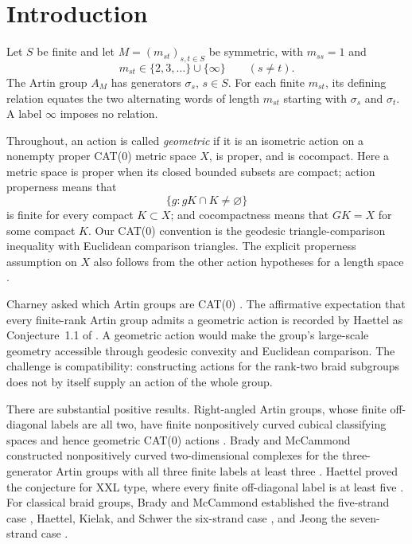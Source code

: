 \section{Introduction}\label{sec:introduction}

Let \(S\) be finite and let \(M=(m_{st})_{s,t\in S}\) be symmetric,
with \(m_{ss}=1\) and
\[
 m_{st}\in\{2,3,\ldots\}\cup\{\infty\}\qquad(s\ne t).
\]
The Artin group \(A_M\) has generators \(\sigma_s\), \(s\in S\).
For each finite \(m_{st}\), its defining relation equates the two
alternating words of length \(m_{st}\) starting with \(\sigma_s\) and
\(\sigma_t\).  A label \(\infty\) imposes no relation.

Throughout, an action is called \emph{geometric} if it is an isometric
action on a nonempty proper CAT(0) metric space \(X\), is proper, and is
cocompact.  Here a metric space is proper when its closed bounded subsets
are compact; action properness means that
\[
 \{g:gK\cap K\ne\varnothing\}
\]
is finite for every compact \(K\subset X\); and cocompactness means that
\(GK=X\) for some compact \(K\).  Our CAT(0) convention is the geodesic
triangle-comparison inequality with Euclidean comparison triangles.
The explicit properness assumption on \(X\) also follows from the other
action hypotheses for a length space
\cite[Exercise~I.8.4(1)]{BridsonHaefliger1999}.

Charney asked which Artin groups are CAT(0)
\cite[Problem~4]{CharneyProblems}.  The affirmative expectation that every
finite-rank Artin group admits a geometric action is recorded by Haettel
as Conjecture~1.1 of \cite{Haettel2022}.  A geometric action
would make the group's large-scale geometry accessible through geodesic
convexity and Euclidean comparison.  The challenge is compatibility:
constructing actions for the rank-two braid subgroups does not by itself
supply an action of the whole group.

There are substantial positive results.  Right-angled Artin groups,
whose finite off-diagonal labels are all two, have finite nonpositively
curved cubical classifying spaces and hence geometric CAT(0) actions
\cite[preprint Theorem~3.1.1]{CharneyDavis1995}.
Brady and McCammond constructed
nonpositively curved two-dimensional complexes for the three-generator
Artin groups with all three finite labels at least three
\cite[preprint Theorem~4]{BradyMcCammond2000}.  Haettel proved the conjecture for
XXL type, where every finite off-diagonal label is at least five
\cite[Theorem~1.4]{Haettel2022}.
For classical braid groups, Brady and McCammond established the
five-strand case \cite[Theorem~B]{BradyMcCammond2010},
Haettel, Kielak, and Schwer the six-strand case
\cite[preprint Corollary~4.18]{HaettelKielakSchwer2016}, and Jeong the
seven-strand case \cite[preprint Corollary~14]{Jeong2023}.

